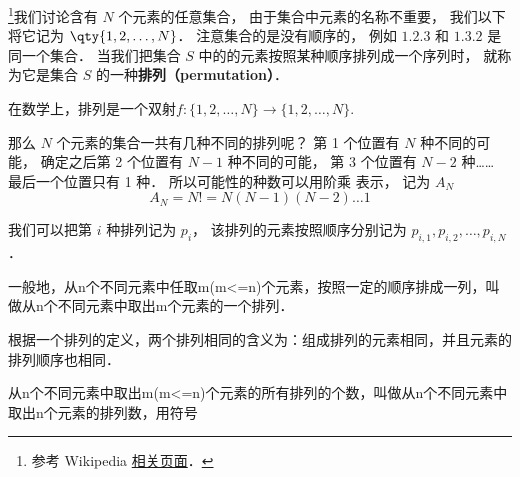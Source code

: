 


\footnote{参考 Wikipedia \href{https://en.wikipedia.org/wiki/Permutation}{相关页面}．}我们讨论含有 $N$ 个元素的任意集合， 由于集合中元素的名称不重要， 我们以下将它记为 $\qty{1,2,\dots, N}$． 注意集合的是没有顺序的， 例如 $\qty{1,2,3}$ 和 $\qty{1,3,2}$ 是同一个集合． 当我们把集合 $S$ 中的的元素按照某种顺序排列成一个序列时， 就称为它是集合 $S$ 的一种\textbf{排列（permutation）}．

在数学上，排列是一个双射$f:\{1,2,\dots,N\}\rightarrow\{1,2,\dots,N\}$.

那么 $N$ 个元素的集合一共有几种不同的排列呢？ 第 1 个位置有 $N$ 种不同的可能， 确定之后第 2 个位置有 $N-1$ 种不同的可能， 第 3 个位置有 $N-2$ 种…… 最后一个位置只有 1 种． 所以可能性的种数可以用阶乘 表示， 记为 $A_N$
\begin{equation}
A_N = N! = N(N-1)(N-2)\dots 1
\end{equation}

我们可以把第 $i$ 种排列记为 $p_i$， 该排列的元素按照顺序分别记为 $p_{i,1}, p_{i,2}, \dots, p_{i,N}$．

一般地，从n个不同元素中任取m(m<=n)个元素，按照一定的顺序排成一列，叫做从n个不同元素中取出m个元素的一个排列．

根据一个排列的定义，两个排列相同的含义为：组成排列的元素相同，并且元素的排列顺序也相同．

从n个不同元素中取出m(m<=n)个元素的所有排列的个数，叫做从n个不同元素中取出n个元素的排列数，用符号\begin{equation}

\end{equation}